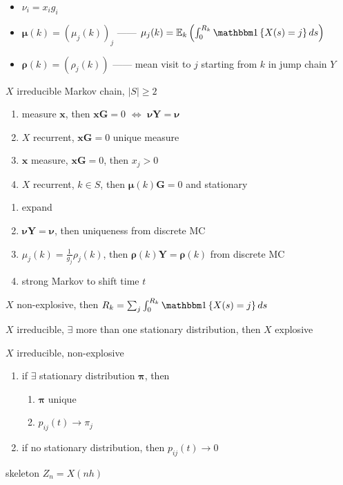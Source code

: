 \begin{itemize}
    \item $\nu_i = x_i g_i$
    \item $\bm \mu(k) = (\mu_j(k))_j$ ------ $\mu_j(k) = \Ex_k\left( \int^{R_k}_0 \In \left\{ X(s) = j \right\} ds \right)$
    \item $\bm \rho(k) = (\rho_j(k))$ ------ mean visit to $j$ starting from $k$ in jump chain $Y$
\end{itemize}

\begin{lemma}\label{lemma:sta}
    $X$ irreducible Markov chain, $|S|\geq 2$
    \begin{enumerate}
        \item measure $\bm x$, then $\bm x \bm G = 0$ $\iff$ $\bm \nu \bm Y= \bm \nu$
        \item $X$ recurrent, $\bm x \bm G = 0$ unique measure
        \item $\bm x$ measure, $\bm x \bm G = 0$, then $x_j > 0$
        \item $X$ recurrent, $k \in S$, then $\bm \mu(k) \bm G = 0$ and stationary \label{lemma:sta4}
    \end{enumerate}
\end{lemma}
\begin{pf}
    \begin{enumerate}
        \item expand
        \item $\bm \nu \bm Y= \bm \nu$, then uniqueness from discrete MC
        \item $\mu_j(k) = \frac{1}{g_j}\rho_j(k)$, then $\bm \rho(k) \bm Y = \bm \rho (k)$ from discrete MC
        \item strong Markov to shift time $t$
    \end{enumerate}
\end{pf}

\begin{fact}
    $X$ non-explosive, then $R_k = \sum_j \int_0^{R_k} \In \left\{ X(s) = j \right\}ds$
\end{fact}

\begin{fact}
    $X$ irreducible, $\exists$ more than one stationary distribution, then $X$ explosive
\end{fact}

\begin{thm}
    $X$ irreducible, non-explosive
    \begin{enumerate}
        \item if $\exists$ stationary distribution $\bm\pi$, then
        \begin{enumerate}
            \item $\bm\pi$ unique
            \item $p_{ij}(t) \rightarrow \pi_j$
        \end{enumerate}
        \item if no stationary distribution, then $p_{ij}(t) \rightarrow 0$
    \end{enumerate}
\end{thm}
\begin{pf}
    skeleton $Z_n = X(nh)$
\end{pf}

